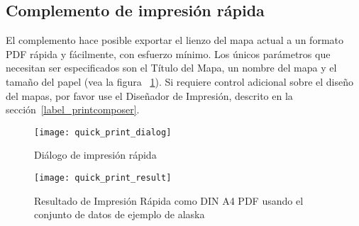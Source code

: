 
\subsection{Complemento de impresión rápida}


El complemento  hace posible exportar el lienzo del mapa actual a un formato PDF rápida y fácilmente, con esfuerzo mínimo. Los únicos parámetros que necesitan ser especificados son el Título del Mapa, un nombre del mapa y el tamaño del papel (vea la figura ~\ref{fig:quickprint}). 
Si requiere control adicional sobre el diseño del mapas, 
por favor use el Diseñador de Impresión, descrito en la sección~\ref{label_printcomposer}.  

\begin{figure}[ht]
   \begin{center}
   \caption{Diálogo de impresión rápida \nixcaption}\label{fig:quickprint}\smallskip
   \texttt{[image: quick\_print\_dialog]}
\end{center}
\end{figure}

\begin{figure}[ht]
   \begin{center}
   \caption{Resultado de Impresión Rápida como DIN A4 PDF usando el conjunto de datos de ejemplo de alaska \nixcaption}\label{fig:quickprint_result}\smallskip
   \texttt{[image: quick\_print\_result]}
\end{center}
\end{figure}
